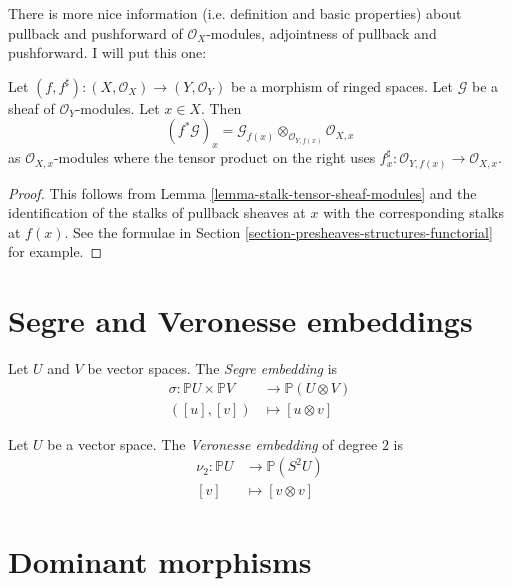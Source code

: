 There is more nice information (i.e. definition and basic properties) about 
pullback and pushforward of $\mathcal{O}_X$-modules, adjointness of pullback and
pushforward. I will put this one:

\begin{lemma}
\label{lemma-stalk-pullback-modules}
Let $(f, f^\sharp) : (X, \mathcal{O}_X) \to (Y, \mathcal{O}_Y)$
be a morphism of ringed spaces.
Let $\mathcal{G}$ be a sheaf of $\mathcal{O}_Y$-modules.
Let $x \in X$. Then
$$
(f^*\mathcal{G})_x =
\mathcal{G}_{f(x)}
\otimes_{\mathcal{O}_{Y, f(x)}}
\mathcal{O}_{X, x}
$$
as $\mathcal{O}_{X, x}$-modules where the tensor product on the right
uses $f^\sharp_x : \mathcal{O}_{Y, f(x)} \to \mathcal{O}_{X, x}$.
\end{lemma}

\begin{proof}
This follows from Lemma \ref{lemma-stalk-tensor-sheaf-modules}
and the identification of the stalks of pullback sheaves
at $x$ with the corresponding stalks at $f(x)$. See the
formulae in Section \ref{section-presheaves-structures-functorial}
for example.
\end{proof}



\section{Segre and Veronesse embeddings}
\label{section-Serge-and-Veronesse}

\begin{definition}
\label{definition-Segre-embedding}
Let $U$ and $V$ be vector spaces. The {\it Segre embedding} is
\begin{align*}
\sigma: \mathbb{P}U\times\mathbb{P}V &\longrightarrow \mathbb{P}(U\otimes V) \\
([u],[v]) &\longmapsto [u\otimes v]
\end{align*}
\end{definition}

\begin{definition}
\label{definition-Veronesse-embedding}
Let $U$ be a vector space. The {\it Veronesse embedding} of degree $2$ is
\begin{align*}
\nu_2: \mathbb{P}U &\longrightarrow \mathbb{P}(S^2U) \\
[v] &\longmapsto [v\otimes v]
\end{align*}
\end{definition}

\section{Dominant morphisms}
\label{section-dominant}

